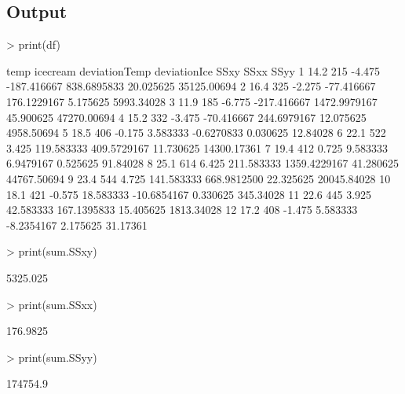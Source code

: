 \documentclass[slidestop,compress,14pt,xcolor=dvipsnames]{beamer}
\begin{document}

\subsection{Output}

\clearpage 

\begin{Schunk}
\begin{Sinput}
> print(df)
\end{Sinput}
\begin{Soutput}
   temp icecream deviationTemp deviationIce         SSxy      SSxx        SSyy
1  14.2      215        -4.475  -187.416667  838.6895833 20.025625 35125.00694
2  16.4      325        -2.275   -77.416667  176.1229167  5.175625  5993.34028
3  11.9      185        -6.775  -217.416667 1472.9979167 45.900625 47270.00694
4  15.2      332        -3.475   -70.416667  244.6979167 12.075625  4958.50694
5  18.5      406        -0.175     3.583333   -0.6270833  0.030625    12.84028
6  22.1      522         3.425   119.583333  409.5729167 11.730625 14300.17361
7  19.4      412         0.725     9.583333    6.9479167  0.525625    91.84028
8  25.1      614         6.425   211.583333 1359.4229167 41.280625 44767.50694
9  23.4      544         4.725   141.583333  668.9812500 22.325625 20045.84028
10 18.1      421        -0.575    18.583333  -10.6854167  0.330625   345.34028
11 22.6      445         3.925    42.583333  167.1395833 15.405625  1813.34028
12 17.2      408        -1.475     5.583333   -8.2354167  2.175625    31.17361
\end{Soutput}
\begin{Sinput}
> print(sum.SSxy)
\end{Sinput}
\begin{Soutput}
[1] 5325.025
\end{Soutput}
\begin{Sinput}
> print(sum.SSxx)
\end{Sinput}
\begin{Soutput}
[1] 176.9825
\end{Soutput}
\begin{Sinput}
> print(sum.SSyy)
\end{Sinput}
\begin{Soutput}
[1] 174754.9
\end{Soutput}
\end{Schunk}
\end{document}
